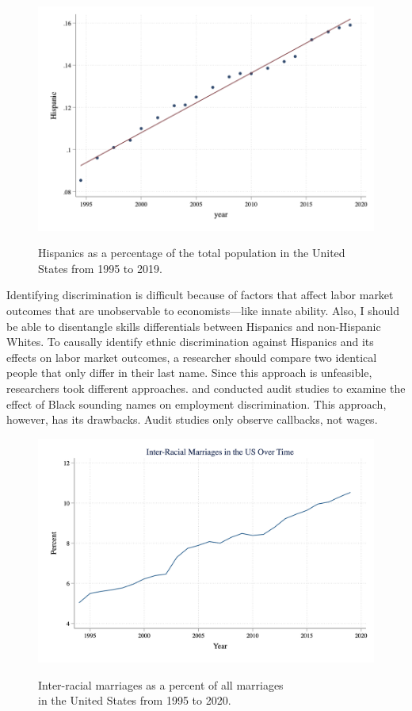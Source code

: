 \documentclass[12pt, fullpage]{article}
\begin{document}
\begin{figure}[H]
\begin{center}
\caption{Hispanics as a percentage of the total population in the United States from 1995 to 2019.}
\includegraphics[width=\textwidth]{HispanicUSA.png} 
\label{fig:2}
\end{center}
\end{figure}

Identifying discrimination is difficult because of factors that affect labor market outcomes that are unobservable to economists---like innate ability. Also, I should be able to disentangle skills differentials between Hispanics and non-Hispanic Whites. To causally identify ethnic discrimination against Hispanics and its effects on labor market outcomes, a researcher should compare two identical people that only differ in their last name. Since this approach is unfeasible, researchers took different approaches. \citet{bertrand2004emily} and \citet{fryer2004causes} conducted audit studies to examine the effect of Black sounding names on employment discrimination. This approach, however, has its drawbacks. Audit studies only observe callbacks, not wages. 

\begin{figure}[H]
\begin{center}
\caption{Inter-racial marriages as a percent of all marriages \\
 in the United States from 1995 to 2020.}
\includegraphics[width=\textwidth]{interracialovertime.png} 
\label{fig:3}
\end{center}
\end{figure}
\end{document}
